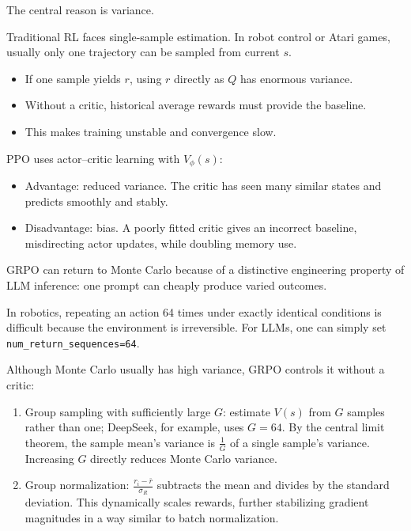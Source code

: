 The central reason is variance.

Traditional RL faces single-sample estimation. In robot control or Atari games, usually only one trajectory can be sampled from current \(s\).

\begin{itemize}
\tightlist
\item
  If one sample yields \(r\), using \(r\) directly as \(Q\) has enormous variance.
\item
  Without a critic, historical average rewards must provide the baseline.
\item
  This makes training unstable and convergence slow.
\end{itemize}

PPO uses actor--critic learning with \(V_{\phi}(s)\):

\begin{itemize}
\tightlist
\item
  Advantage: reduced variance. The critic has seen many similar states and predicts smoothly and stably.
\item
  Disadvantage: bias. A poorly fitted critic gives an incorrect baseline, misdirecting actor updates, while doubling memory use.
\end{itemize}

GRPO can return to Monte Carlo because of a distinctive engineering property of LLM inference: one prompt can cheaply produce varied outcomes.

In robotics, repeating an action 64 times under exactly identical conditions is difficult because the environment is irreversible. For LLMs, one can simply set \texttt{num\_return\_sequences=64}.

Although Monte Carlo usually has high variance, GRPO controls it without a critic:

\begin{enumerate}
\def\labelenumi{\arabic{enumi}.}
\tightlist
\item
  Group sampling with sufficiently large \(G\): estimate \(V(s)\) from \(G\) samples rather than one; DeepSeek, for example, uses \(G=64\). By the central limit theorem, the sample mean's variance is \(\frac{1}{G}\) of a single sample's variance. Increasing \(G\) directly reduces Monte Carlo variance.
\item
  Group normalization: \(\frac{r_i-\bar{r}}{\sigma_R}\) subtracts the mean and divides by the standard deviation. This dynamically scales rewards, further stabilizing gradient magnitudes in a way similar to batch normalization.
\end{enumerate}

